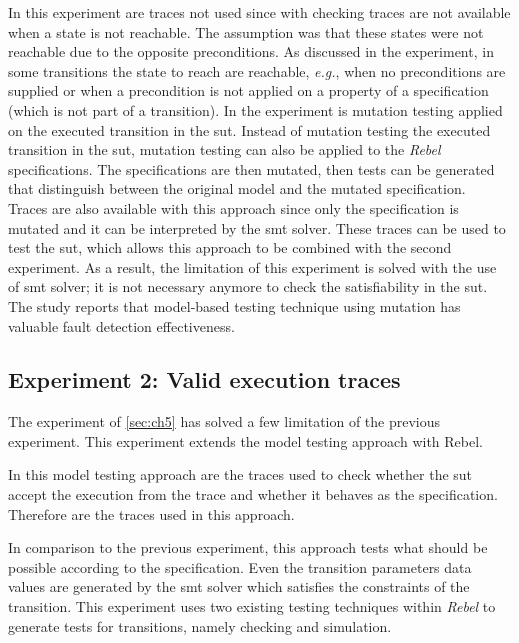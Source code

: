 In this experiment are traces not used since with checking traces are not
available when a state is not reachable. The assumption was that these states
were not reachable due to the opposite preconditions. As discussed in the
experiment, in some transitions the state to reach are reachable, \textit{e.g.},
when no preconditions are supplied or when a precondition is not applied on a
property of a specification (which is not part of a transition). In the
experiment is mutation testing applied on the executed transition in the
\gls{sut}. Instead of mutation testing the executed transition in the
\gls{sut}, mutation testing can also be applied to the \textit{Rebel}
specifications.
The specifications are then mutated, then tests can be generated that
distinguish between the original model and the mutated
specification.~\cite[p.~8]{utting2012taxonomy}
Traces are also available with this approach since only the specification is
mutated and it can be interpreted by the \gls{smt} solver. These traces can be
used to test the \gls{sut}, which allows this approach to be combined with the
second experiment. As a result, the limitation of this experiment is solved
with the use of \gls{smt} solver; it is not necessary anymore to check the
satisfiability in the \gls{sut}. The study \cite{paradkar2005case} reports that
model-based testing technique using mutation has valuable fault detection
effectiveness.


\subsection{Experiment 2: Valid execution traces}
The experiment of \autoref{sec:ch5} has solved a few limitation of the previous
experiment. This experiment extends the model testing approach with Rebel.

In this model testing approach are the traces used to check whether the
\gls{sut} accept the execution from the trace and whether it behaves as the
specification. Therefore are the traces used in this approach.

In comparison to the previous experiment, this approach tests what should be
possible according to the specification. Even the transition parameters data
values are generated by the \gls{smt} solver which satisfies the constraints of
the transition. This experiment uses two existing testing techniques within
\textit{Rebel} to generate tests for transitions, namely checking and
simulation.

